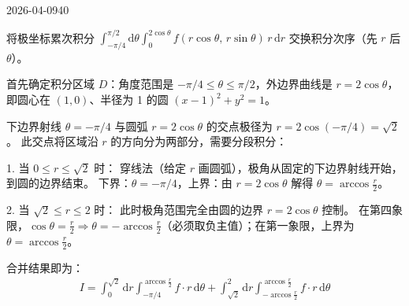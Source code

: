 \begin{mistake}{2026-04-09}{40}

\begin{problemcontent}
将极坐标累次积分 \( \displaystyle\int_{-\pi/4}^{\pi/2} \mathrm{d}\theta \int_0^{2\cos\theta} f(r\cos\theta,\, r\sin\theta)\,r\,\mathrm{d}r \) 交换积分次序（先 \( r \) 后 \( \theta \)）。
\end{problemcontent}

\begin{solutioncontent}
首先确定积分区域 \( D \)：角度范围是 \( -\pi/4 \leqslant \theta \leqslant \pi/2 \)，外边界曲线是 \( r = 2\cos\theta \)，即圆心在 \( (1,0) \)、半径为 1 的圆 \( (x-1)^2+y^2=1 \)。

下边界射线 \( \theta = -\pi/4 \) 与圆弧 \( r = 2\cos\theta \) 的交点极径为 \( r = 2\cos(-\pi/4) = \sqrt{2} \)。
此交点将区域沿 \( r \) 的方向分为两部分，需要分段积分：

1. 当 \( 0 \leqslant r \leqslant \sqrt{2} \) 时：
穿线法（给定 \( r \) 画圆弧），极角从固定的下边界射线开始，到圆的边界结束。
下界：\( \theta = -\pi/4 \)，上界：由 \( r = 2\cos\theta \) 解得 \( \theta = \arccos\frac{r}{2} \)。

2. 当 \( \sqrt{2} \leqslant r \leqslant 2 \) 时：
此时极角范围完全由圆的边界 \( r = 2\cos\theta \) 控制。
在第四象限，\(\cos\theta = \frac{r}{2} \Rightarrow \theta = -\arccos\frac{r}{2}\)（必须取负主值）；在第一象限，上界为 \( \theta = \arccos\frac{r}{2} \)。

合并结果即为：
\[
\begin{aligned}
I = \int_0^{\sqrt{2}} \mathrm{d}r \int_{-\pi/4}^{\arccos\frac{r}{2}} f \cdot r\,\mathrm{d}\theta + \int_{\sqrt{2}}^{2} \mathrm{d}r \int_{-\arccos\frac{r}{2}}^{\arccos\frac{r}{2}} f \cdot r\,\mathrm{d}\theta
\end{aligned}
\]
\end{solutioncontent}


\end{mistake}
